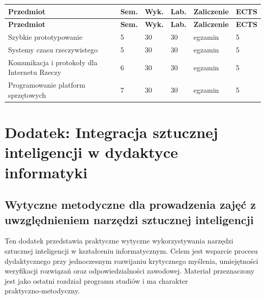 \documentclass[12pt,a4paper]{article}
\newcommand{\thdrule}{\noalign{\global\setlength{\extrarowheight}{0pt}}}
\newcommand{\thdend}{\noalign{\global\setlength{\extrarowheight}{4pt}}}
\begin{document}
{\scriptsize
\begin{longtable}{m{6.5cm}m{0.7cm}m{1cm}m{1cm}m{1.7cm}m{0.7cm}}
\thdrule\toprule
\rowcolor{pjatkRed}
{\color{white}\footnotesize\textbf{\vphantom{Ag}Przedmiot}} & {\color{white}\footnotesize\textbf{\vphantom{Ag}Sem.}} & {\color{white}\footnotesize\textbf{\vphantom{Ag}Wyk.}} & {\color{white}\footnotesize\textbf{\vphantom{Ag}Lab.}} & {\color{white}\footnotesize\textbf{\vphantom{Ag}Zaliczenie}} & {\color{white}\footnotesize\textbf{\vphantom{Ag}ECTS}} \\
\midrule\thdend
\endfirsthead
\thdrule\toprule
\rowcolor{pjatkRed}
{\color{white}\footnotesize\textbf{\vphantom{Ag}Przedmiot}} & {\color{white}\footnotesize\textbf{\vphantom{Ag}Sem.}} & {\color{white}\footnotesize\textbf{\vphantom{Ag}Wyk.}} & {\color{white}\footnotesize\textbf{\vphantom{Ag}Lab.}} & {\color{white}\footnotesize\textbf{\vphantom{Ag}Zaliczenie}} & {\color{white}\footnotesize\textbf{\vphantom{Ag}ECTS}} \\
\midrule\thdend
\endhead
\rowcolor{tableRowLight} Szybkie prototypowanie & 5 & 30 & 30 & {\scriptsize egzamin} & 5 \\
\rowcolor{tableRowAlt} Systemy czasu rzeczywistego & 5 & 30 & 30 & {\scriptsize egzamin} & 5 \\
\rowcolor{tableRowLight} Komunikacja i protokoły dla Internetu Rzeczy & 6 & 30 & 30 & {\scriptsize egzamin} & 5 \\
\rowcolor{tableRowAlt} Programowanie platform sprzętowych & 7 & 30 & 30 & {\scriptsize egzamin} & 5 \\
\bottomrule
\end{longtable}}




\newpage
\section*{Dodatek: Integracja sztucznej inteligencji w dydaktyce informatyki}

\subsection*{Wytyczne metodyczne dla prowadzenia zajęć z uwzględnieniem narzędzi sztucznej inteligencji}
\vspace{0.3cm}
\noindent Ten dodatek przedstawia praktyczne wytyczne wykorzystywania narzędzi sztucznej inteligencji w kształceniu informatycznym. Celem jest wsparcie procesu dydaktycznego przy jednoczesnym rozwijaniu krytycznego myślenia, umiejętności weryfikacji rozwiązań oraz odpowiedzialności zawodowej. Materiał przeznaczony jest jako ostatni rozdział programu studiów i ma charakter praktyczno‑metodyczny.
\bigskip
\end{document}
